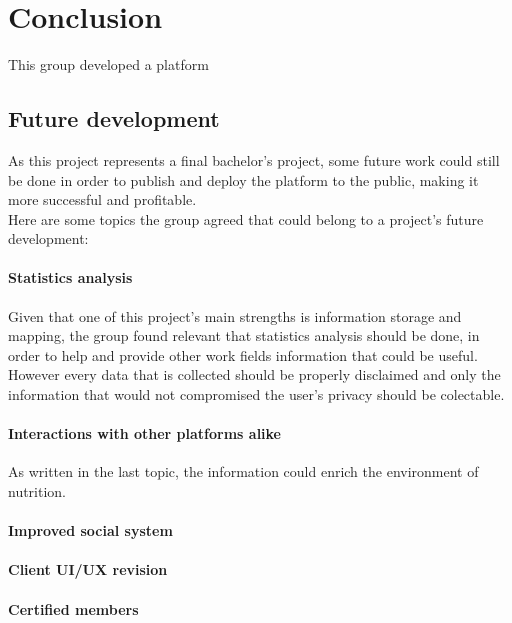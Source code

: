 \chapter{Conclusion}

This group developed a platform 

\section{Future development}

As this project represents a final bachelor's project, some future work could still be done in order
to publish and deploy the platform to the public, making it more successful and profitable.\\

Here are some topics the group agreed that could belong to a project's future development:

\subsubsection{Statistics analysis}
Given that one of this project's main strengths is information storage and mapping, the group found
relevant that statistics analysis should be done, in order to help and provide other work fields
information that could be useful.\\

However every data that is collected should be properly disclaimed and only the information that
would not compromised the user's privacy should be colectable.

\subsubsection{Interactions with other platforms alike}

As written in the last topic, the information could enrich the environment of nutrition.

\subsubsection{Improved social system}

\subsubsection{Client UI/UX revision}

\subsubsection{Certified members}

